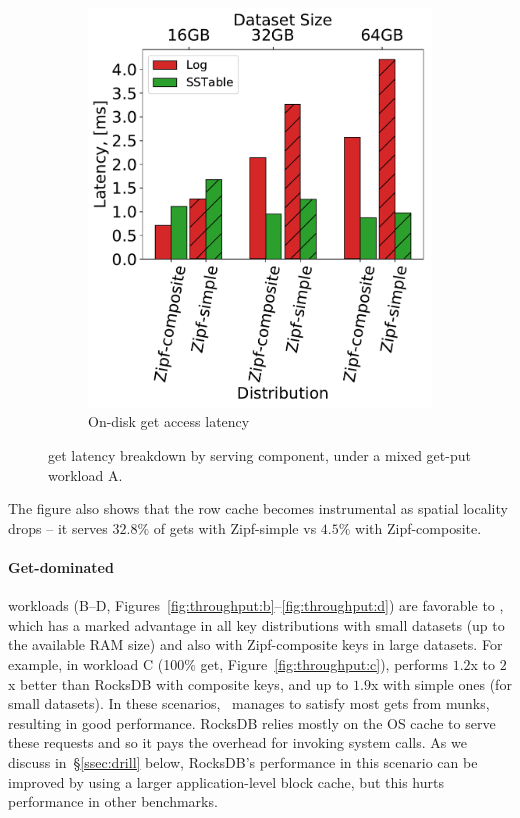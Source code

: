 \begin{figure}[htb]
\begin{subfigure}{0.49\linewidth}
\includegraphics[width=\textwidth]{figs/Latency_A.pdf}
\caption{On-disk get access latency}
\label{fig:readstat:lat}
\end{subfigure}
\caption{{\sys\/ get latency breakdown by serving component, under a mixed get-put workload A.}}
\label{fig:readstat}
\end{figure}

The figure also shows that the row cache becomes instrumental as spatial locality drops -- it serves $32.8\%$ of gets with Zipf-simple 
vs $4.5\%$ with Zipf-composite. 

\paragraph{ Get-dominated} 
workloads (B--D, Figures~\ref{fig:throughput:b}--\ref{fig:throughput:d}) are 
favorable to 
\sys, which has a marked advantage in all key distributions with small datasets (up to the available RAM size) 
and also with Zipf-composite keys in large datasets. 
For example, in workload C (100\% get, Figure~\ref{fig:throughput:c}), 
\sys\/ performs $1.2$x to $2$x better than RocksDB with composite keys,
and up to $1.9$x  with simple ones (for small datasets). 
In these scenarios, \sys\  manages to satisfy most gets from munks, resulting in good performance.
RocksDB relies mostly on the OS cache to serve these requests and so it pays the overhead for invoking system calls. 
As we discuss in~\S\ref{ssec:drill} below, 
RocksDB's performance in this scenario can be improved by using a larger application-level block cache,
but this hurts performance in other benchmarks.

